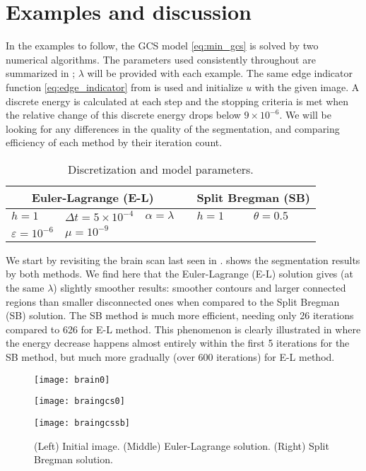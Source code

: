 \section{Examples and discussion}
In the examples to follow, the GCS model \eqref{eq:min_gcs} is solved by two numerical algorithms. The parameters used consistently throughout are summarized in ;  $\lambda$ will be provided with each example. The same edge indicator function \eqref{eq:edge_indicator} from  is used and initialize $u$ with the given image. A discrete energy is calculated at each step and the stopping criteria is met when the relative change of this discrete energy drops below $9\times 10^{-6}$. We will be looking for any differences in the quality of the segmentation, and comparing efficiency of each method by their iteration count.

\begin{table}[htb!]
	\caption[]{Discretization and model parameters.}
	\centering
	\begin{tabular}{lll c ll} \toprule[1.25pt]
		\multicolumn{3}{c}{Euler-Lagrange (E-L)} & \phantom{abc} & \multicolumn{2}{c}{Split Bregman (SB)}
		\\ \midrule
		$h = 1$ & $\Delta t = 5\times 10^{-4}$ & $\alpha = \lambda$ & & $h = 1$ & $\theta = 0.5$
		\\
		$\varepsilon=10^{-6}$ & $\mu = 10^{-9}$
		\\ \bottomrule[1.25pt]
	\end{tabular}
	\label{tab:model parameters}
\end{table}

We start by revisiting the brain scan last seen in .  shows the segmentation results by both methods. We find here that the Euler-Lagrange (E-L) solution gives (at the same $\lambda$) slightly smoother results: smoother contours and larger connected regions than smaller disconnected ones when compared to the Split Bregman (SB) solution. The SB method is much more efficient, needing only 26 iterations compared to 626 for E-L method. This phenomenon is clearly illustrated in  where the energy decrease happens almost entirely within the first 5 iterations for the SB method, but much more gradually (over 600 iterations) for E-L method.
\begin{figure}[htb!]
	\centering
	\begin{minipage}{0.31\textwidth}
		\texttt{[image: brain0]}
	\end{minipage}%
	\begin{minipage}{0.31\textwidth}
		\texttt{[image: braingcs0]}
	\end{minipage}%
	\begin{minipage}{0.31\textwidth}
		\texttt{[image: braingcssb]}
	\end{minipage}
	\caption{(Left) Initial image. (Middle) Euler-Lagrange solution. (Right) Split Bregman solution.}
	\label{fig:brain_gcs}
\end{figure}

